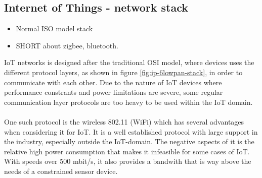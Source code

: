 \subsection{Internet of Things - network stack}

\begin{itemize}
	\item Normal ISO model stack
	\item SHORT about zigbee, bluetooth.
\end{itemize}

IoT networks is designed after the traditional OSI model, where devices uses the different protocol layers, as shown in figure \ref{fig:ip-6lowpan-stack}, in order to communicate with each other. 
Due to the nature of IoT devices where performance constrants and power limitations are severe, some regular communication layer protocols are too heavy to be used within the IoT domain.
\\\\
One such protocol is the wireless 802.11 (WiFi) which has several advantages when considering it for IoT. It is a well established protocol with large support in the industry, especially outside the IoT-domain. The negative aspects of it is the relative high power consumption that makes it infeasible for some cases of IoT. With speeds over 500 mbit/s, it also provides a bandwith that is way above the needs of a constrained sensor device. 
\\\\




